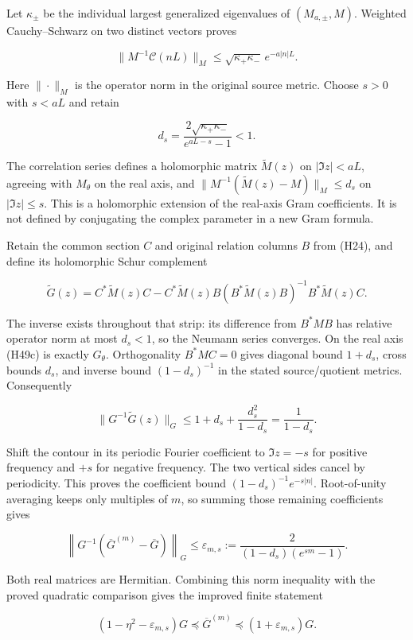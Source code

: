 Let \(\kappa_\pm\) be the individual largest generalized eigenvalues of
\((M_{a,\pm},M)\). Weighted Cauchy--Schwarz on two distinct vectors
proves

\[
 \|M^{-1}\mathcal C(nL)\|_M
 \leq\sqrt{\kappa_+\kappa_-}\,e^{-a|n|L}.
 \tag{H49a}
\]

Here \(\|\cdot\|_M\) is the operator norm in the original source metric.
Choose \(s>0\) with \(s<aL\) and retain

\[
 d_s=\frac{2\sqrt{\kappa_+\kappa_-}}{e^{aL-s}-1}<1.
 \tag{H49b}
\]

The correlation series defines a holomorphic matrix \(\widetilde M(z)\)
on \(|\Im z|<aL\), agreeing with \(M_\theta\) on the real axis, and
\(\|M^{-1}(\widetilde M(z)-M)\|_M\leq d_s\) on \(|\Im z|\leq s\). This
is a holomorphic extension of the real-axis Gram coefficients. It is not
defined by conjugating the complex parameter in a new Gram formula.

Retain the common section \(C\) and original relation columns \(B\) from
(H24), and define its holomorphic Schur complement

\[
 \widetilde G(z)=C^*\widetilde M(z)C
 -C^*\widetilde M(z)B
 (B^*\widetilde M(z)B)^{-1}B^*\widetilde M(z)C.
 \tag{H49c}
\]

The inverse exists throughout that strip: its difference from \(B^*MB\)
has relative operator norm at most \(d_s<1\), so the Neumann series
converges. On the real axis (H49c) is exactly \(G_\theta\).
Orthogonality \(B^*MC=0\) gives diagonal bound \(1+d_s\), cross bounds
\(d_s\), and inverse bound \((1-d_s)^{-1}\) in the stated
source/quotient metrics. Consequently

\[
 \|G^{-1}\widetilde G(z)\|_G
 \leq1+d_s+\frac{d_s^2}{1-d_s}
 =\frac1{1-d_s}.
 \tag{H49d}
\]

Shift the contour in its periodic Fourier coefficient to \(\Im z=-s\)
for positive frequency and \(+s\) for negative frequency. The two
vertical sides cancel by periodicity. This proves the coefficient bound
\((1-d_s)^{-1}e^{-s|n|}\). Root-of-unity averaging keeps only multiples
of \(m\), so summing those remaining coefficients gives

\[
 \left\|G^{-1}(\overline G^{(m)}-\overline G)\right\|_G
 \leq\varepsilon_{m,s}
 :=\frac{2}{(1-d_s)(e^{sm}-1)}.
 \tag{H49e}
\]

Both real matrices are Hermitian. Combining this norm inequality with
the proved quadratic comparison gives the improved finite statement

\[
 (1-\eta^2-\varepsilon_{m,s})G
 \preceq\overline G^{(m)}
 \preceq(1+\varepsilon_{m,s})G.
 \tag{H49f}
\]

